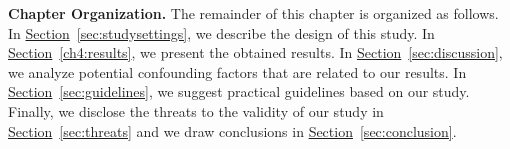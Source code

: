 \DIFdelbegin %

\DIFdelend \noindent \textbf{Chapter Organization.} The remainder of this chapter is
organized as follows. In
\hyperref[sec:studysettings]{Section}~\ref{sec:studysettings}, we describe the
design of this study. In \hyperref[ch4:results]{Section}~\ref{ch4:results}, we
present the obtained results. In
\hyperref[sec:discussion]{Section}~\ref{sec:discussion}, we analyze potential
confounding factors that are related to our results. In
\hyperref[sec:guidelines]{Section}~\ref{sec:guidelines}, we suggest practical
guidelines based on our study. Finally, we disclose the threats to the validity
of our study in \hyperref[sec:threats]{Section}~\ref{sec:threats} and we draw
conclusions in \hyperref[sec:conclusion]{Section}~\ref{sec:conclusion}. 

